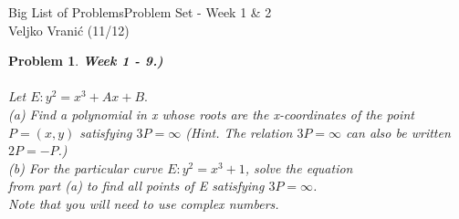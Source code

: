 \documentclass[12pt]{article}
\newtheorem{problem}{Problem}
\begin{document}
\noindent Big List of Problems\hfill Problem Set - Week 1 \& 2\\
Veljko Vranić (11/12)

\hrulefill


\begin{problem} \textbf{Week 1 - 9.)} \\ \\
Let $E : y^2 = x^3 + Ax + B.$\\

(a) Find a polynomial in x whose roots are the x-coordinates of the point \\
$P = (x, y)$ satisfying $3P = \infty$ (Hint. The relation $3P = \infty$ can also be written $2P = - P$.)  \\

(b) For the particular curve $E: y^2 = x^3 + 1$, solve the equation \\
from part (a) to find all points of E satisfying $3P = \infty$. \\
Note that you will need to use complex numbers.
\end{problem}
\end{document}
